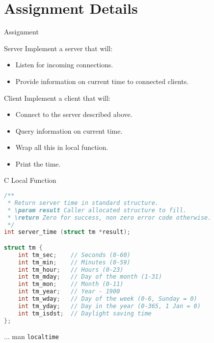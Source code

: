 \section{Assignment Details}


\begin{frame}{Assignment}
    \begin{block}{Server}
        Implement a server that will:
        \begin{itemize}
            \item Listen for incoming connections.
            \item Provide information on current time to connected clients.
        \end{itemize}
    \end{block}

    \bigskip

    \begin{block}{Client}
        Implement a client that will:
        \begin{itemize}
            \item Connect to the server described above.
            \item Query information on current time.
            \item Wrap all this in local function.
            \item Print the time.
        \end{itemize}
    \end{block}
\end{frame}


\begin{frame}[fragile]{C Local Function}
\begin{lstlisting}[language=c,style=mini]
/**
 * Return server time in standard structure.
 * \param result Caller allocated structure to fill.
 * \return Zero for success, non zero error code otherwise.
 */
int server_time (struct tm *result);

struct tm {
    int tm_sec;    // Seconds (0-60)
    int tm_min;    // Minutes (0-59)
    int tm_hour;   // Hours (0-23)
    int tm_mday;   // Day of the month (1-31)
    int tm_mon;    // Month (0-11)
    int tm_year;   // Year - 1900
    int tm_wday;   // Day of the week (0-6, Sunday = 0)
    int tm_yday;   // Day in the year (0-365, 1 Jan = 0)
    int tm_isdst;  // Daylight saving time
};
\end{lstlisting}
    \hfill ... man \lstinline{localtime}
\end{frame}


